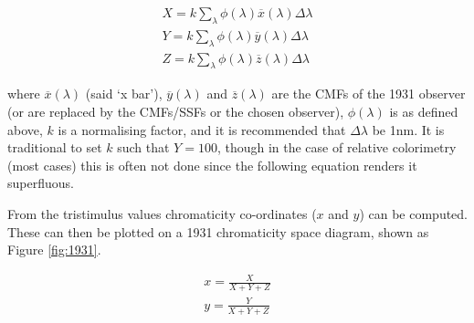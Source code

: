 
\begin{subequations}
\begin{align}
X=k \sum_{\lambda} \phi(\lambda) \overline{x}(\lambda) \Delta \lambda \\ 
Y=k \sum_{\lambda} \phi(\lambda) \overline{y}(\lambda) \Delta \lambda \\ 
Z=k \sum_{\lambda} \phi(\lambda) \overline{z}(\lambda) \Delta \lambda
\end{align}
\label{eq:XYZ}
\end{subequations}

\nopagebreak %

where $\overline{x}(\lambda)$ (said `x bar'), $\overline{y}(\lambda)$ and $\overline{z}(\lambda)$ are the \glspl{CMF} of the 1931 observer (or are replaced by the \Glspl{CMF}/\Glspl{SSF} or the chosen observer), $\phi(\lambda)$ is as defined above, $k$ is a normalising factor, and it is recommended that $\Delta\lambda$ be 1nm. It is traditional to set $k$ such that $Y=100$, though in the case of relative colorimetry (most cases) this is often not done since the following equation renders it superfluous.

From the tristimulus values chromaticity co-ordinates ($x$ and $y$) can be computed. These can then be plotted on a 1931 chromaticity space diagram, shown as Figure \ref{fig:1931}.

\begin{subequations}
\begin{align}
x=\frac{X}{X+Y+Z} \\
y=\frac{Y}{X+Y+Z} 
\end{align}
\label{eq:1931chrom}
\end{subequations}






